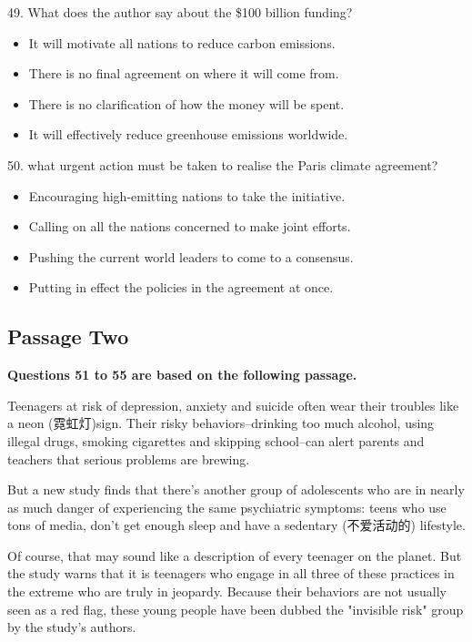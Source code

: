 \documentclass[UTF8,11pt]{ctexart}
\begin{document}
49. What does the author say about the \$100 billion funding?


\begin{itemize}[leftmargin=2em,itemsep=.2em,topsep=.4em]\item[A.] It will motivate all nations to reduce carbon emissions.
\item[B.] There is no final agreement on where it will come from.
\item[C.] There is no clarification of how the money will be spent.
\item[D.] It will effectively reduce greenhouse emissions worldwide.
\end{itemize}

50. what urgent action must be taken to realise the Paris climate agreement?


\begin{itemize}[leftmargin=2em,itemsep=.2em,topsep=.4em]\item[A.] Encouraging high-emitting nations to take the initiative.
\item[B.] Calling on all the nations concerned to make joint efforts.
\item[C.] Pushing the current world leaders to come to a consensus.
\item[D.] Putting in effect the policies in the agreement at once.
\end{itemize}

\subsection*{\textbf{Passage Two}}


\textbf{Questions 51 to 55 are based on the following passage.}


Teenagers at risk of depression, anxiety and suicide often wear their troubles like a neon (霓虹灯)sign. Their risky behaviors--drinking too much alcohol, using illegal drugs, smoking cigarettes and skipping school--can alert parents and teachers that serious problems are brewing.


But a new study finds that there's another group of adolescents who are in nearly as much danger of experiencing the same psychiatric symptoms: teens who use tons of media, don't get enough sleep and have a sedentary (不爱活动的) lifestyle.


Of course, that may sound like a description of every teenager on the planet. But the study warns that it is teenagers who engage in all three of these practices in the extreme who are truly in jeopardy. Because their behaviors are not usually seen as a red flag, these young people have been dubbed the "invisible risk" group by the study's authors.
\end{document}

